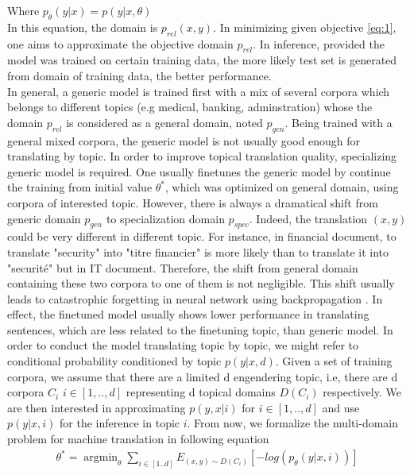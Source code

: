 \documentclass[11pt,a4paper]{article}
\DeclareMathOperator*{\argmin}{argmin}
\begin{document}
Where $p_{\theta}(y|x) = p(y|x,\theta)$ \\
In this equation, the domain is $p_{rel}(x,y)$. In minimizing given objective \ref{eq:1}, one aims to approximate the objective domain $p_{rel}$. In inference, provided the model was trained on certain training data, the more likely test set is generated from domain of training data, the better performance.\\
In general, a generic model is trained first with a mix of several corpora which belongs to different topics (e.g medical, banking, adminstration) whose the domain $p_{rel}$ is considered as a general domain, noted $p_{gen}$. Being trained with a general mixed corpora, the generic model is not usually good enough for translating by topic. In order to improve topical translation quality, specializing generic model is required. One usually finetunes the generic model by continue the training from initial value $\theta^*$, which was optimized on general domain, using corpora of interested topic. However, there is always a dramatical shift from generic domain $p_{gen}$ to specialization domain $p_{spec}$. Indeed, the translation $(x,y)$ could be very different in different topic. For instance, in financial document, to translate "security" into "titre financier" is more likely than to translate it into "securit\'e" but in IT document. Therefore, the shift from general domain containing these two corpora to one of them is not negligible. This shift usually leads to catastrophic forgetting in neural network using backpropagation \cite{McCloskey1989Catastrophic}. In effect, the finetuned model usually shows lower performance in translating sentences, which are less related to the finetuning topic, than generic model. 
In order to conduct the model translating topic by topic, we might refer to conditional probability conditioned by topic $p(y|x,d)$. Given a set of training corpora, we assume that there are a limited d engendering topic, i.e, there are d corpora $C_i$ $i \in [1,..,d]$ representing d topical domains $D(C_i)$ respectively. We are then interested in approximating $p(y,x|i)$ for $i \in [1,..,d]$ and use $p(y|x,i)$ for the inference in topic $i$. From now, we formalize the multi-domain problem for machine translation in following equation
\begin{equation} \label{eq:2}
\begin{split}
\theta^* = \argmin_{\theta} \displaystyle{\mathop{\sum}_{i \in [1..d]}} E_{(x,y) \sim D(C_{i})}[-log(p_{\theta}(y|x,i))]
\end{split}
\end{equation}
\end{document}
